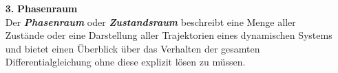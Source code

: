 \begin{itemize}
    \item[\textbf{3.}]\textbf{Phasenraum}\\
    Der \textit{\textbf{Phasenraum}} oder \textit{\textbf{Zustandsraum}} beschreibt eine Menge aller Zustände oder eine Darstellung aller Trajektorien eines dynamischen Systems und bietet einen Überblick über das Verhalten der gesamten Differentialgleichung ohne diese explizit lösen zu müssen.\\ %


\end{itemize}
